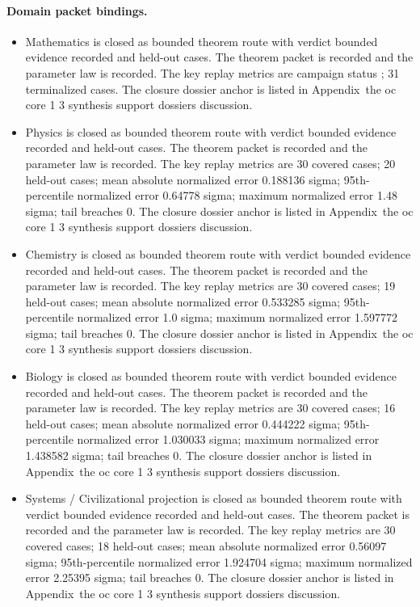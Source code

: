 \paragraph{Domain packet bindings.}
\begin{itemize}[leftmargin=1.6em,nosep]
\item Mathematics is closed as bounded theorem route with verdict bounded evidence recorded and  held-out cases. The theorem packet is recorded and the parameter law is recorded. The key replay metrics are campaign status ; 31 terminalized cases. The closure dossier anchor is listed in Appendix~the oc core 1 3 synthesis support dossiers discussion.
\item Physics is closed as bounded theorem route with verdict bounded evidence recorded and  held-out cases. The theorem packet is recorded and the parameter law is recorded. The key replay metrics are 30 covered cases; 20 held-out cases; mean absolute normalized error 0.188136 sigma; 95th-percentile normalized error 0.64778 sigma; maximum normalized error 1.48 sigma; tail breaches 0. The closure dossier anchor is listed in Appendix~the oc core 1 3 synthesis support dossiers discussion.
\item Chemistry is closed as bounded theorem route with verdict bounded evidence recorded and  held-out cases. The theorem packet is recorded and the parameter law is recorded. The key replay metrics are 30 covered cases; 19 held-out cases; mean absolute normalized error 0.533285 sigma; 95th-percentile normalized error 1.0 sigma; maximum normalized error 1.597772 sigma; tail breaches 0. The closure dossier anchor is listed in Appendix~the oc core 1 3 synthesis support dossiers discussion.
\item Biology is closed as bounded theorem route with verdict bounded evidence recorded and  held-out cases. The theorem packet is recorded and the parameter law is recorded. The key replay metrics are 30 covered cases; 16 held-out cases; mean absolute normalized error 0.444222 sigma; 95th-percentile normalized error 1.030033 sigma; maximum normalized error 1.438582 sigma; tail breaches 0. The closure dossier anchor is listed in Appendix~the oc core 1 3 synthesis support dossiers discussion.
\item Systems / Civilizational projection is closed as bounded theorem route with verdict bounded evidence recorded and  held-out cases. The theorem packet is recorded and the parameter law is recorded. The key replay metrics are 30 covered cases; 18 held-out cases; mean absolute normalized error 0.56097 sigma; 95th-percentile normalized error 1.924704 sigma; maximum normalized error 2.25395 sigma; tail breaches 0. The closure dossier anchor is listed in Appendix~the oc core 1 3 synthesis support dossiers discussion.

\end{itemize}
